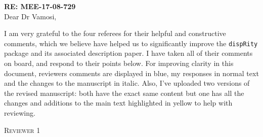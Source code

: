 \documentclass[12pt,letterpaper]{article}
\renewcommand{\section}[1]{%
\bigskip
\begin{center}
\begin{Large}
\normalfont\scshape #1
\medskip
\end{Large}
\end{center}}
\begin{document}
\textbf{RE: MEE-17-08-729 }\\
\bigskip
Dear Dr Vamosi,\\
\bigskip

I am very grateful to the four referees for their helpful and constructive comments, which we believe have helped us to significantly improve the \texttt{dispRity} package and its associated description paper.
I have taken all of their comments on board, and respond to their points below.
For improving clarity in this document, reviewers comments are displayed in blue, my responses in normal text and the changes to the manuscript in italic.
Also, I've uploaded two versions of the revised manuscript: both have the exact same content but one has all the changes and additions to the main text highlighted in yellow to help with reviewing.





%
%




\section{Reviewer 1}
\end{document}
